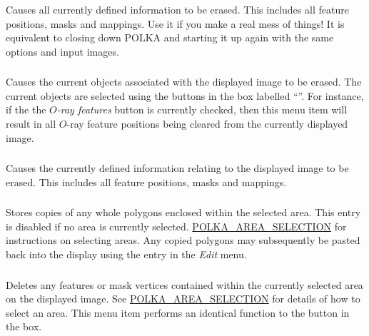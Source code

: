 \subsubsection {} Causes all currently defined information to be
erased. This includes all feature positions, masks and mappings. Use it
if you make a real mess of things! It is equivalent to closing down POLKA 
and starting it up again with the same options and input images.

\subsubsection {} Causes the
current objects associated with the displayed image to be erased. The
current objects are selected using the buttons in the box labelled
``''. For instance, if the the
{\em $O$-ray features} button is currently checked, then this menu item
will result in all $O$-ray feature positions being cleared from the
currently displayed image.

\subsubsection {} Causes the
currently defined information relating to the displayed image to be
erased. This includes all feature positions, masks and mappings.

\subsubsection {} Stores copies of any
whole polygons enclosed within the selected area. This entry is disabled
if no area is currently selected. \hyperref{Go here}{See
section}{}{POLKA_AREA_SELECTION} for instructions on selecting areas. Any
copied polygons may subsequently be pasted back into the display using
the  entry in the {\em Edit} menu.

\subsubsection {} Deletes any features
or mask vertices contained within the currently selected area on the
displayed image. See \hyperref{here}{section }{}{POLKA_AREA_SELECTION}
for details of how to select an area. This menu item performs an
identical function to the  button in
the  box.

